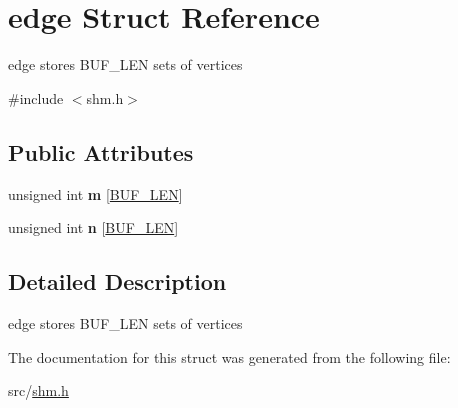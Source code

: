 \hypertarget{structedge}{}\section{edge Struct Reference}
\label{structedge}


edge stores B\+U\+F\+\_\+\+L\+EN sets of vertices  




{\ttfamily \#include $<$shm.\+h$>$}

\subsection*{Public Attributes}
\begin{DoxyCompactItemize}
\item 
\mbox{\label{structedge_af75cb214a94da2b5d9020696be89c009}} 
unsigned int {\bfseries m} \mbox{[}\hyperlink{shm_8h_a8b5839f71a3b6e7d64b2d5e9967e3dd1}{B\+U\+F\+\_\+\+L\+EN}\mbox{]}
\item 
\mbox{\label{structedge_a443f4fd52ef6f17e8e323f87be62d44d}} 
unsigned int {\bfseries n} \mbox{[}\hyperlink{shm_8h_a8b5839f71a3b6e7d64b2d5e9967e3dd1}{B\+U\+F\+\_\+\+L\+EN}\mbox{]}
\end{DoxyCompactItemize}


\subsection{Detailed Description}
edge stores B\+U\+F\+\_\+\+L\+EN sets of vertices 

The documentation for this struct was generated from the following file\+:\begin{DoxyCompactItemize}
\item 
src/\hyperlink{shm_8h}{shm.\+h}\end{DoxyCompactItemize}
